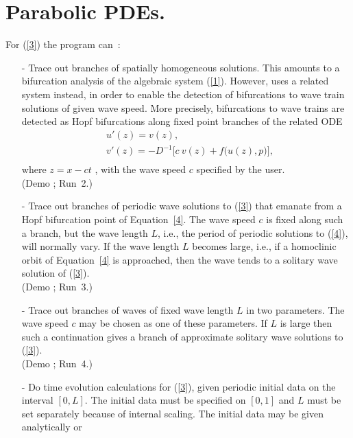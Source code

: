 \section{ Parabolic PDEs.} \label{sec:Parabolic_PDEs}
For (\ref{3}) the program can~:~
 
\begin{itemize}
\item[-]
  Trace out branches of spatially homogeneous solutions.
  This amounts to a bifurcation analysis of the algebraic
  system (\ref{1}). However, \AUTO uses a related system instead,
  in order to enable the detection of bifurcations to wave train
  solutions of given wave speed. More precisely, bifurcations
  to wave trains are detected as Hopf bifurcations along fixed
  point branches of the related ODE
  \begin{equation} \label{4} \begin{array}{cl}
  & u'(z) = v(z) ,\\
  & v'(z) =-D^{-1}  \bigl[ c~v(z) + f\bigl( u(z) , p \bigr) \bigr], \\
  \end{array} \end{equation}
  where $z = x - ct$ , with the wave speed $c$ specified by the user.\\
  (Demo ; Run~2.) 
\item[-]
  Trace out branches of periodic wave solutions to (\ref{3}) that emanate
  from a Hopf bifurcation point of Equation~\ref{4}.
  The wave speed $c$ is  fixed along such a branch, but
  the wave length $L$, i.e., the period of periodic solutions 
  to (\ref{4}),
  will normally vary. If the wave length $L$ becomes large,
  i.e., if a homoclinic orbit of Equation~\ref{4} is approached,
  then the wave tends to a solitary wave solution of (\ref{3}). \\
  (Demo ; Run~3.) 
\item[-]
  Trace out branches of waves of fixed wave length $L$ in two parameters. 
  The wave speed $c$ may be chosen as one of these parameters.
  If $L$ is large then such a continuation gives a branch
  of approximate solitary wave solutions to (\ref{3}).\\
  (Demo ; Run~4.) 
\item[-]
  Do time evolution calculations for (\ref{3}), given periodic
  initial data on the interval $[0,L]$.
  The initial data must be specified on $[0,1]$ and
  $L$ must be set separately because of internal scaling.
  The initial data may be given analytically or

\end{itemize}
